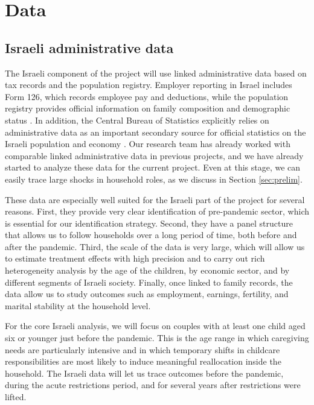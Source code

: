 \documentclass[12pt]{article}
\begin{document}
\section{Data}

\subsection{Israeli administrative data}

The Israeli component of the project will use linked administrative data based on tax records and the population registry. Employer reporting in Israel includes Form 126, which records employee pay and deductions, while the population registry provides official information on family composition and demographic status \citep{tax126,nationalinsurance126,piba_registry}. In addition, the Central Bureau of Statistics explicitly relies on administrative data as an important secondary source for official statistics on the Israeli population and economy \citep{cbs_about}. Our research team has already worked with comparable linked administrative data in previous projects, and we have already started to analyze these data for the current project. Even at this stage, we can easily trace large shocks in household roles, as we discuss in Section \ref{sec:prelim}.

These data are especially well suited for the Israeli part of the project for several reasons. First, they provide very clear identification of pre-pandemic sector, which is essential for our identification strategy. Second, they have a panel structure that allows us to follow households over a long period of time, both before and after the pandemic. Third, the scale of the data is very large, which will allow us to estimate treatment effects with high precision and to carry out rich heterogeneity analysis by the age of the children, by economic sector, and by different segments of Israeli society. Finally, once linked to family records, the data allow us to study outcomes such as employment, earnings, fertility, and marital stability at the household level.

For the core Israeli analysis, we will focus on couples with at least one child aged six or younger just before the pandemic. This is the age range in which caregiving needs are particularly intensive and in which temporary shifts in childcare responsibilities are most likely to induce meaningful reallocation inside the household. The Israeli data will let us trace outcomes before the pandemic, during the acute restrictions period, and for several years after restrictions were lifted.
\end{document}
